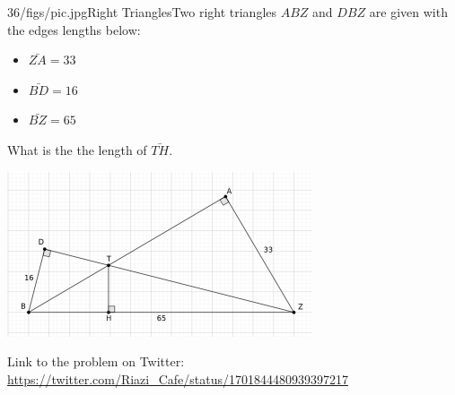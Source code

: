 \begin{problem}{36/figs/pic.jpg}{Right Triangles}Two right triangles $ABZ$ and $DBZ$ are given with the edges lengths below: 

\begin{itemize}
\item $\bar{ZA}=33$

\item $\bar{BD} =16$

\item $\bar{BZ}=65$
\end{itemize}
What is the the length of $\bar{TH}$.

\begin{center}
\includegraphics[width=9cm]{36/figs/36_biruni.png}
\end{center}

Link to the problem on Twitter:  \url{https://twitter.com/Riazi_Cafe/status/1701844480939397217}\end{problem}